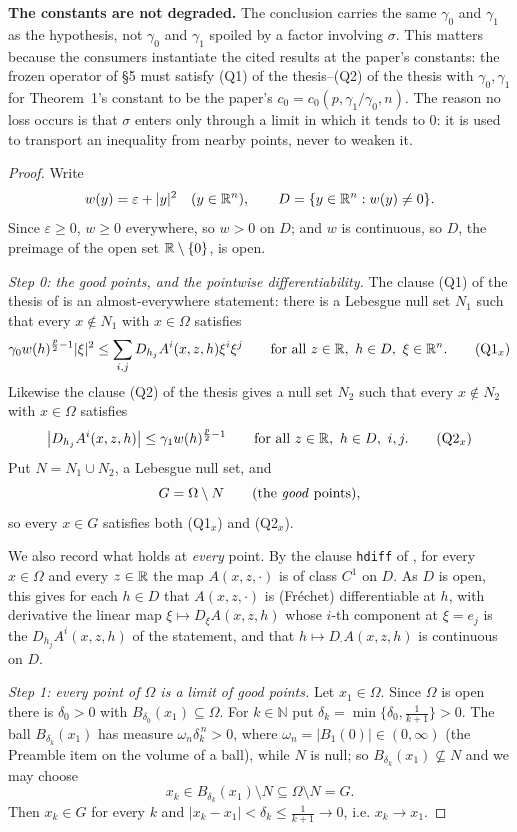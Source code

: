 \begin{lemma}
\noindent\textbf{The constants are not degraded.}  The conclusion carries the
same $\gamma_0$ and $\gamma_1$ as the hypothesis, not $\gamma_0$ and $\gamma_1$
spoiled by a factor involving $\sigma$.  This matters because the consumers
instantiate the cited results at the paper's constants: the frozen operator of
\S5 must satisfy (Q1) of the thesis--(Q2) of the thesis with $\gamma_0,\gamma_1$ for
Theorem~1's constant to be the paper's $c_0=c_0(p,\gamma_1/\gamma_0,n)$.  The
reason no loss occurs is that $\sigma$ enters only through a limit in which it
tends to $0$: it is used to transport an inequality from nearby points, never to
weaken it.
\end{lemma}
\begin{proof}
Write
\[
w(y)=\varepsilon+|y|^2\quad(y\in\mathbb{R}^n),
\qquad
D=\{y\in\mathbb{R}^n:w(y)\ne0\} .
\]
Since $\varepsilon\ge0$, $w\ge0$ everywhere, so $w>0$ on $D$; and $w$ is
continuous, so $D$, the preimage of the open set $\mathbb{R}\setminus\{0\}$, is open.

\emph{Step 0: the good points, and the pointwise differentiability.}  The clause
(Q1) of the thesis of  is an almost-everywhere
statement: there is a Lebesgue null set $N_1$ such that every $x\notin N_1$ with
$x\in\Omega$ satisfies
\[
\gamma_0w(h)^{\frac p2-1}|\xi|^2\le\sum_{i,j}D_{h_j}A^i(x,z,h)\xi^i\xi^j
\qquad\text{for all }z\in\mathbb{R},\ h\in D,\ \xi\in\mathbb{R}^n .
\tag{Q1$_x$}
\]
Likewise the clause (Q2) of the thesis gives a null set $N_2$ such that every
$x\notin N_2$ with $x\in\Omega$ satisfies
\[
\bigl|D_{h_j}A^i(x,z,h)\bigr|\le\gamma_1w(h)^{\frac p2-1}
\qquad\text{for all }z\in\mathbb{R},\ h\in D,\ i,j .
\tag{Q2$_x$}
\]
Put $N=N_1\cup N_2$, a Lebesgue null set, and
\[
G=\Omega\setminus N\qquad(\text{the \emph{good} points}),
\]
so every $x\in G$ satisfies both (Q1$_x$) and (Q2$_x$).

We also record what holds at \emph{every} point.  By the clause
\texttt{hdiff} of , for every $x\in\Omega$ and
every $z\in\mathbb{R}$ the map $A(x,z,\cdot)$ is of class $C^1$ on $D$.  As $D$ is open,
this gives for each $h\in D$ that $A(x,z,\cdot)$ is (Fr\'echet) differentiable at
$h$, with derivative the linear map $\xi\mapsto D_\xi A(x,z,h)$ whose $i$-th
component at $\xi=e_j$ is the $D_{h_j}A^i(x,z,h)$ of the statement, and that
$h\mapsto D_\cdot A(x,z,h)$ is continuous on $D$.

\emph{Step 1: every point of $\Omega$ is a limit of good points.}  Let
$x_1\in\Omega$.  Since $\Omega$ is open there is $\delta_0>0$ with
$B_{\delta_0}(x_1)\subseteq\Omega$.  For $k\in\mathbb{N}$ put
$\delta_k=\min\{\delta_0,\tfrac1{k+1}\}>0$.  The ball $B_{\delta_k}(x_1)$ has
measure $\omega_n\delta_k^{\,n}>0$, where $\omega_n=|B_1(0)|\in(0,\infty)$ (the
Preamble item on the volume of a ball), while $N$ is null; so
$B_{\delta_k}(x_1)\not\subseteq N$ and we may choose
\[
x_k\in B_{\delta_k}(x_1)\setminus N\subseteq\Omega\setminus N=G .
\]
Then $x_k\in G$ for every $k$ and $|x_k-x_1|<\delta_k\le\frac1{k+1}\to0$, i.e.
$x_k\to x_1$.


\end{proof}
